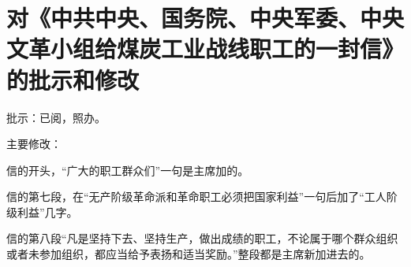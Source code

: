 \section[对《中共中央、国务院、中央军委、中央文革小组给煤炭工业战线职工的一封信》的批示和修改（一九六七年八月十六日）]{对《中共中央、国务院、中央军委、中央文革小组给煤炭工业战线职工的一封信》的批示和修改}


批示：已阅，照办。


主要修改：

信的开头，“广大的职工群众们”一句是主席加的。

信的第七段，在“无产阶级革命派和革命职工必须把国家利益”一句后加了“工人阶级利益”几字。

信的第八段“凡是坚持下去、坚持生产，做出成绩的职工，不论属于哪个群众组织或者未参加组织，都应当给予表扬和适当奖励。”整段都是主席新加进去的。

